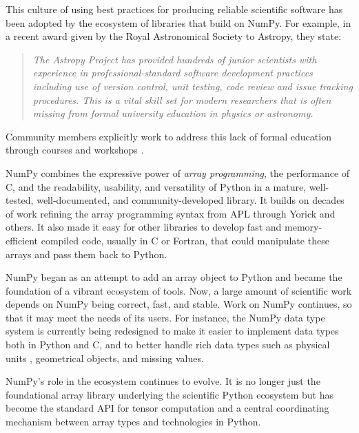 
This culture of using best practices for producing reliable scientific software
has been adopted by the ecosystem of libraries that build on NumPy.
For example, in a recent award given by the Royal Astronomical Society to
Astropy, they state:
\begin{quotation}
\noindent\emph{The Astropy Project has provided hundreds of junior scientists
with experience in professional-standard software development practices
including use of version control, unit testing, code review and issue tracking
procedures. This is a vital skill set for modern researchers that is often
missing from formal university education in physics or astronomy.}
\end{quotation}
Community members explicitly work to address this lack of formal education
through courses and workshops
\cite{wilson-software-carpentry,hannay-scientific-software-survey,millman2018teaching}.

NumPy combines the expressive power of \emph{array programming}, 
the performance of C, and
the readability, usability, and versatility of Python in a mature,
well-tested, well-documented, and community-developed library.
It builds on decades of work refining the array programming
syntax from APL through Yorick and others.
It also made it easy for other libraries to develop fast and
memory-efficient compiled code, usually in C or Fortran, that could manipulate
these arrays and pass them back to Python.

NumPy began as an attempt to add an array object to Python and became
the foundation of a vibrant ecosystem of tools.
Now, a large amount of scientific work depends on NumPy being correct,
fast, and stable.
Work on NumPy continues, so that it may meet the needs of its users.  For instance, the NumPy data type system is currently being redesigned to make it
easier to implement data types both in Python and C, and to better handle
rich data types such as physical units \cite{astropy,Goldbaum2018},
geometrical objects, and missing values.

NumPy's role in the ecosystem continues to evolve. It is no longer just the foundational array library underlying the
scientific Python ecosystem but has become the standard API for tensor
computation and a central coordinating mechanism between array types and
technologies in Python.
